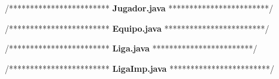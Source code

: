 \documentclass[10pt]{article}
\begin{document}
{\begin{enumerate}
\begin{multicols}{2}
\end{multicols}

\newpage 

/************************ \textbf{Jugador.java} ************************/



/************************ \textbf{Equipo.java} ************************/



/************************ \textbf{Liga.java} ************************/



/************************ \textbf{LigaImp.java} ************************/



\end{enumerate}

}
\end{document}
